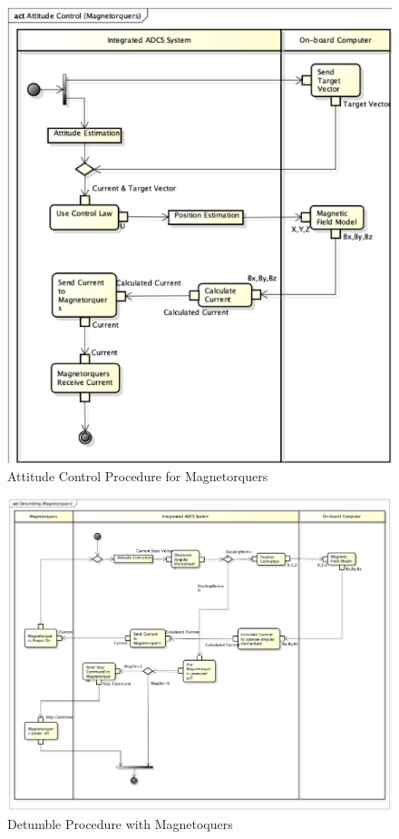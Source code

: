 \documentclass[conf]{new-aiaa}
\begin{document}
\begin{figure}[H]
\centering
\includegraphics[width=1.0\textwidth]{Figures/AC_Mag_AD.png}
\caption{Attitude Control Procedure for Magnetorquers}
\label{fig:AC_Mag_AD}
\end{figure}

\begin{figure}[H]
\centering
\includegraphics[width=1.0\textwidth]{Figures/AC_DT_Mag_AD.png}
\caption{Detumble Procedure with Magnetoquers}
\label{fig:AC_DetumMag_AD}
\end{figure}
\end{document}
